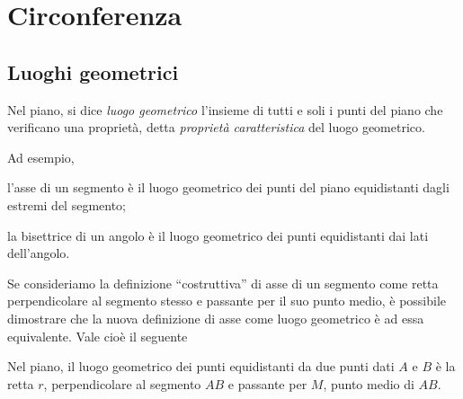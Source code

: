 
\chapter{Circonferenza}\label{chap:circonferenza}


\section{Luoghi geometrici}\label{sect:luoghi_geometrici}

\begin{definizione}
Nel piano, si dice \emph{luogo geometrico} l'insieme di tutti e soli 
i punti del piano che verificano una proprietà, detta \emph{proprietà 
caratteristica} del luogo geometrico.
\end{definizione}
Ad esempio,
\begin{itemize*}
\item l'asse di un segmento è il luogo geometrico dei punti del piano 
equidistanti dagli estremi del segmento;
\item la bisettrice di un angolo è il luogo geometrico dei punti 
equidistanti dai lati dell'angolo.
\end{itemize*}
Se consideriamo la definizione ``costruttiva'' di asse di un segmento 
come retta perpendicolare al segmento stesso e passante per il suo 
punto medio, è possibile dimostrare che la nuova definizione di asse 
come luogo geometrico è ad essa equivalente.
Vale cioè il seguente
\begin{teorema}
Nel piano, il luogo geometrico dei punti equidistanti da due punti 
dati \(A\) e \(B\) è la retta \(r\), perpendicolare al segmento \(AB\) e 
passante per \(M\), punto medio di \(AB\).
\end{teorema}

